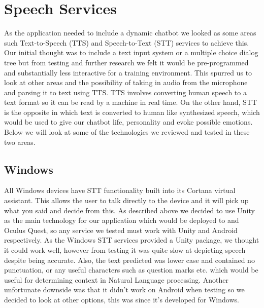 \section{Speech Services}
As the application needed to include a dynamic chatbot we looked as some areas such Text-to-Speech (TTS) and Speech-to-Text (STT) services to achieve this. Our initial thought was to include a text input system or a multiple choice dialog tree but from testing and further research we felt it would be pre-programmed and substantially less interactive for a training environment. This spurred us to look at other areas and the possibility of taking in audio from the microphone and parsing it to text using TTS. TTS involves converting human speech to a text format so it can be read by a machine in real time. On the other hand, STT is the opposite in which text is converted to human like synthesized speech, which would be used to give our chatbot life, personality and evoke possible emotions. Below we will look at some of the technologies we reviewed and tested in these two areas.

\subsection{Windows}
All Windows devices have STT functionality built into its Cortana virtual assistant. This allows the user to talk directly to the device and it will pick up what you said and decide from this. As described above we decided to use Unity as the main technology for our application which would be deployed to and Oculus Quest, so any service we tested must work with Unity and Android respectively. As the Windows STT services provided a Unity package, we thought it could work well, however from testing it was quite slow at depicting speech despite being accurate. Also, the text predicted was lower case and contained no punctuation, or any useful characters such as question marks etc. which would be useful for determining context in Natural Language processing. Another unfortunate downside was that it didn't work on Android when testing so we decided to look at other options, this was since it's developed for Windows. 

